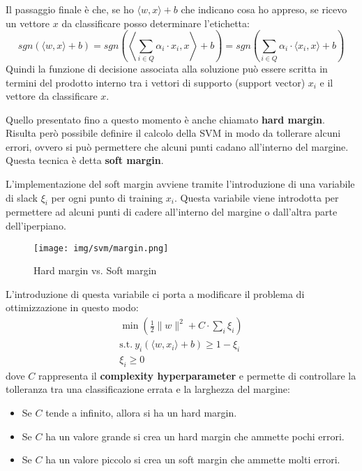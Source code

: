 Il passaggio finale è che, se ho $\langle w, x \rangle + b$ che indicano cosa ho
appreso, se ricevo un vettore $x$ da classificare posso determinare l'etichetta:
\begin{equation}
    sgn(\langle w, x \rangle + b) = sgn\left(\left\langle \sum_{i \in Q} \alpha_i
    \cdot x_i, x \right\rangle + b \right) = sgn\left(\sum_{i \in Q} \alpha_i
    \cdot \langle x_i, x\rangle + b \right)
\end{equation}
Quindi la funzione di decisione associata alla soluzione può essere scritta in
termini del prodotto interno tra i vettori di supporto (support vector) $x_i$ e
il vettore da classificare $x$.

Quello presentato fino a questo momento è anche chiamato \textbf{hard margin}.
Risulta però possibile definire il calcolo della SVM in modo da tollerare alcuni
errori, ovvero si può permettere che alcuni punti cadano all'interno del margine.
Questa tecnica è detta \textbf{soft margin}.

L'implementazione del soft margin avviene tramite l'introduzione di una variabile
di slack $\xi_i$ per ogni punto di training $x_i$. Questa variabile viene
introdotta per permettere ad alcuni punti di cadere all'interno del margine o
dall'altra parte dell'iperpiano.
\begin{figure}[!ht]
    \centering
    \texttt{[image: img/svm/margin.png]}
    \caption{Hard margin vs. Soft margin}
    \label{fig:soft_margin}
\end{figure}
L'introduzione di questa variabile ci porta a modificare il problema di ottimizzazione
in questo modo:
\begin{equation}
    \begin{aligned}
        \min \left(\frac{1}{2} \| w \|^2 + C \cdot \sum_{i} \xi_i \right) \\
        \text{s.t.} \ y_i (\langle w, x_i \rangle + b) \geq 1 - \xi_i     \\
        \xi_i \geq 0
    \end{aligned}
\end{equation}
dove $C$ rappresenta il \textbf{complexity hyperparameter} e permette di
controllare la tolleranza  tra una classificazione errata e la larghezza del
margine:
\begin{itemize}
    \item Se $C$ tende a infinito, allora si ha un hard margin.
    \item Se $C$ ha un valore grande si crea un hard margin che ammette pochi
          errori.
    \item Se $C$ ha un valore piccolo si crea un soft margin che ammette molti
          errori.
\end{itemize}
